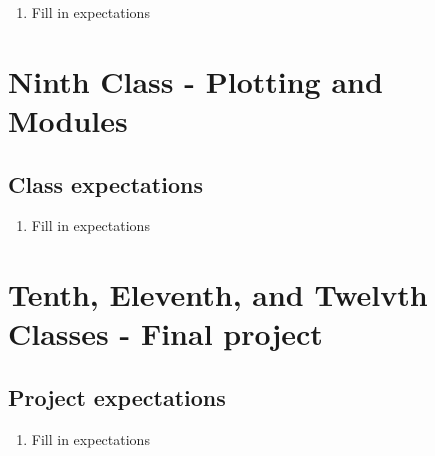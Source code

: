 \documentclass[paper=a4, fontsize=11pt]{scrartcl} %
\numberwithin{equation}{section} %
\numberwithin{figure}{section} %
\numberwithin{table}{section} %
\begin{document}
\begin{enumerate}
\item Fill in expectations
\end{enumerate}


\section{Ninth Class - Plotting and Modules}


\subsection{Class expectations}

\begin{enumerate}
\item Fill in expectations
\end{enumerate}


\section{Tenth, Eleventh, and Twelvth Classes - Final project}


\subsection{Project expectations}

\begin{enumerate}
\item Fill in expectations
\end{enumerate}

\end{document}

